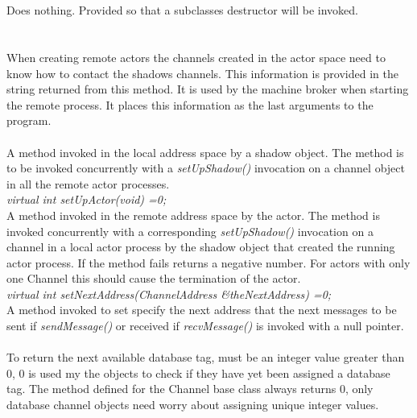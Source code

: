  \\
\\ 
Does nothing. Provided so that a subclasses destructor will be invoked. \\

  \\
 \\
When creating remote actors the channels created in the actor space
need to know how to contact the shadows channels. This information is
provided in the string returned from this method. It is used by the
machine broker when starting the remote process. It places this
information as the last arguments to the program. \\

 \\
A method invoked in the local address space by a shadow object. The
method is to be invoked concurrently with a {\em setUpShadow()}
invocation on a channel object in all the remote actor processes.\\

{\em virtual int setUpActor(void) =0;} \\
A method invoked in the remote address space by the actor. The method
is invoked concurrently with a corresponding {\em setUpShadow()}
invocation on a channel in a local actor process by the shadow object
that created the running actor process. If the method fails returns a
negative number. For actors with only one Channel this should cause
the termination of the actor. \\

{\em virtual int setNextAddress(ChannelAddress \&theNextAddress) =0;}\\
A method invoked to set specify the next address that the next
messages to be sent if {\em sendMessage()} or received if {\em
recvMessage()} is invoked with a null pointer. \\

 \\
To return the next available database tag, must be an integer value
greater than $0$, $0$ is used my the objects to check if they have yet
been assigned a database tag. The method defined for the Channel base
class always returns $0$, only database channel objects need worry
about assigning unique integer values. \\

